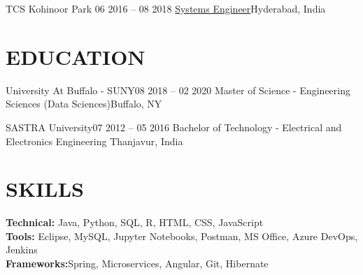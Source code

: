 \documentclass[letterpaper,12pt]{article}
\begin{document}
    \resumeSubheading
      {TCS Kohinoor Park \href{https://linkedin.com/in/siddiq-syed}{\raisebox{-0.1\height}\faExternalLink }}{06 2016 -- 08 2018} 
      {\underline{Systems Engineer}}{Hyderabad, India}
      \resumeItemListStart
      \resumeItemListEnd  
  \resumeSubHeadingListEnd

\section{EDUCATION}
\vspace{4pt}
  \resumeSubHeadingListStart
    \resumeSubheading
      {University At Buffalo - SUNY}{08 2018 -- 02 2020}
      {Master of Science - Engineering Sciences (Data Sciences)}{Buffalo, NY}
  \resumeSubHeadingListEnd
  
  \resumeSubHeadingListStart
    \resumeSubheading
      {SASTRA University}{07 2012 -- 05 2016}
      {Bachelor of Technology - Electrical and Electronics Engineering }{Thanjavur, India}
  \resumeSubHeadingListEnd
  
\section{SKILLS}
\vspace{4pt}
 \begin{itemize}[leftmargin=0.15in, label={}]
    \small{\item{
     \textbf{\normalsize{Technical:}}{ \normalsize{Java, Python, SQL, R, HTML, CSS, JavaScript}} \\
     \textbf{\normalsize{Tools:}}{ \normalsize{Eclipse, MySQL, Jupyter Notebooks, Postman, MS Office, Azure DevOps, Jenkins}} \\
     \textbf{\normalsize{Frameworks:}}{\normalsize{Spring, Microservices, Angular, Git, Hibernate}} \\
    }}
 \end{itemize}

\end{document}
